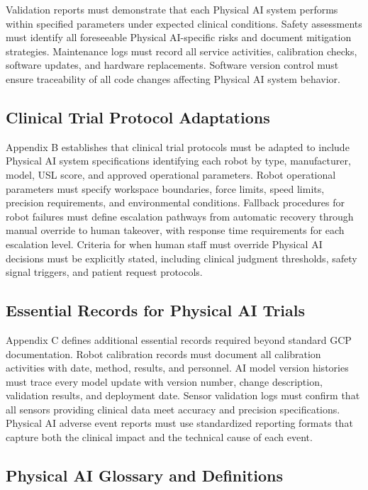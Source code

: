 Validation reports must demonstrate that each Physical AI system performs within
specified parameters under expected clinical conditions. Safety assessments must
identify all foreseeable Physical AI-specific risks and document mitigation
strategies. Maintenance logs must record all service activities, calibration
checks, software updates, and hardware replacements. Software version control
must ensure traceability of all code changes affecting Physical AI system
behavior.

\subsection{Clinical Trial Protocol Adaptations}
\label{subsec:ich-protocol}

Appendix B establishes that clinical trial protocols must be adapted to include
Physical AI system specifications identifying each robot by type, manufacturer,
model, USL score, and approved operational parameters. Robot operational
parameters must specify workspace boundaries, force limits, speed limits,
precision requirements, and environmental conditions. Fallback procedures for
robot failures must define escalation pathways from automatic recovery through
manual override to human takeover, with response time requirements for each
escalation level. Criteria for when human staff must override Physical AI
decisions must be explicitly stated, including clinical judgment thresholds,
safety signal triggers, and patient request protocols.

\subsection{Essential Records for Physical AI Trials}
\label{subsec:ich-records}

Appendix C defines additional essential records required beyond standard GCP
documentation. Robot calibration records must document all calibration activities
with date, method, results, and personnel. AI model version histories must trace
every model update with version number, change description, validation results,
and deployment date. Sensor validation logs must confirm that all sensors
providing clinical data meet accuracy and precision specifications. Physical AI
adverse event reports must use standardized reporting formats that capture both
the clinical impact and the technical cause of each event.

\subsection{Physical AI Glossary and Definitions}
\label{subsec:ich-glossary}

